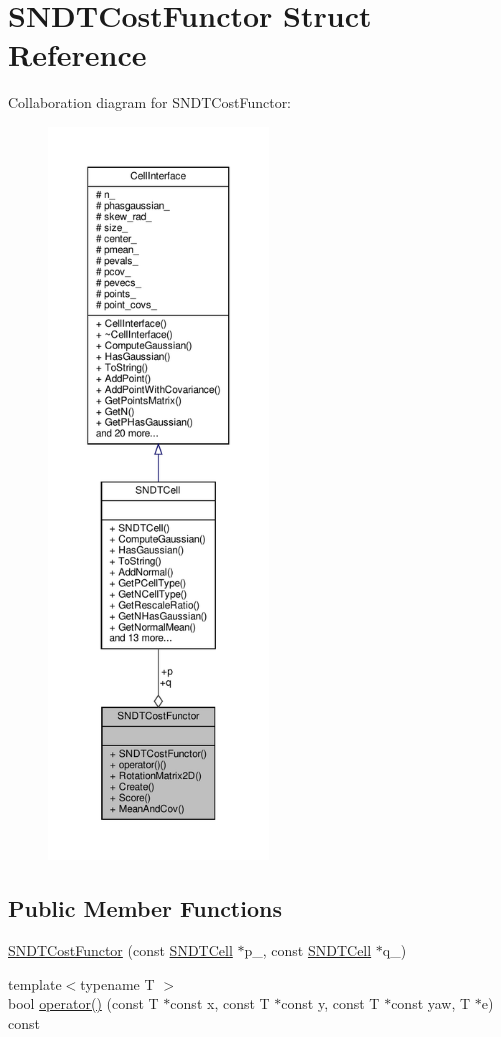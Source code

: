 \hypertarget{structSNDTCostFunctor}{}\section{S\+N\+D\+T\+Cost\+Functor Struct Reference}
\label{structSNDTCostFunctor}


Collaboration diagram for S\+N\+D\+T\+Cost\+Functor\+:\nopagebreak
\begin{figure}[H]
\begin{center}
\leavevmode
\includegraphics[height=550pt]{d5/d38/structSNDTCostFunctor__coll__graph}
\end{center}
\end{figure}
\subsection*{Public Member Functions}
\begin{DoxyCompactItemize}
\item 
\hyperlink{structSNDTCostFunctor_aad83537dc2e4a90d2a5c74f59c5d50e0}{S\+N\+D\+T\+Cost\+Functor} (const \hyperlink{classSNDTCell}{S\+N\+D\+T\+Cell} $\ast$p\+\_\+, const \hyperlink{classSNDTCell}{S\+N\+D\+T\+Cell} $\ast$q\+\_\+)
\item 
{\footnotesize template$<$typename T $>$ }\\bool \hyperlink{structSNDTCostFunctor_aa90d5ea666b39220dc48e0474172268b}{operator()} (const T $\ast$const x, const T $\ast$const y, const T $\ast$const yaw, T $\ast$e) const
\end{DoxyCompactItemize}

